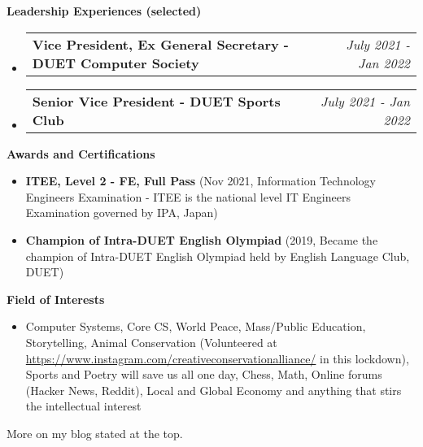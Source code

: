 \documentclass[letterpaper,10pt]{article}
\makeatletter
\newcommand{\resheading}[1]{{\large \colorbox{mygrey}{\begin{minipage}{\textwidth}{\textbf{#1 \vphantom{p\^{E}}}}\end{minipage}}}}
\newcommand{\ressubheading}[4]{
	\begin{tabular*}{7.1in}{l@{\extracolsep{\fill}}r}
		\textbf{#1} & \textit{#4} \\
	\end{tabular*}\vspace{-6pt}}
\makeatother
\begin{document}
	\vspace{0.2in}
	
	\resheading{Leadership Experiences (selected)}
	\begin{itemize}
		\item \ressubheading{Vice President, Ex General Secretary - DUET Computer Society}{}{}{July 2021 - Jan 2022}
		\item \ressubheading{Senior Vice President - DUET Sports Club}{}{}{July 2021 - Jan 2022}
		
	\end{itemize}

	\vspace{0.2in}
	
	\resheading{Awards and Certifications}
	\begin{itemize}
	
		\item \textbf{ITEE, Level 2 - FE, Full Pass} (Nov 2021,  Information Technology Engineers Examination - ITEE is the national level IT Engineers Examination governed by IPA, Japan) 
		
		\item \textbf{Champion of Intra-DUET English Olympiad} (2019, Became the champion of Intra-DUET English Olympiad held by English Language Club, DUET)

	\end{itemize}

	\vspace{0.2in}
	
	\resheading{Field of Interests}
		\begin{itemize}
			\item Computer Systems, Core CS,  World Peace, Mass/Public Education, Storytelling, Animal Conservation (Volunteered at \url{https://www.instagram.com/creativeconservationalliance/} in this lockdown), Sports and Poetry will save us all one day, Chess, Math, Online forums (Hacker News, Reddit), Local and Global Economy and anything that stirs the intellectual interest
		\end{itemize}

	\vspace{0.2in}
	
    More on my blog stated at the top.
    
    \vfill
    
\end{document}
